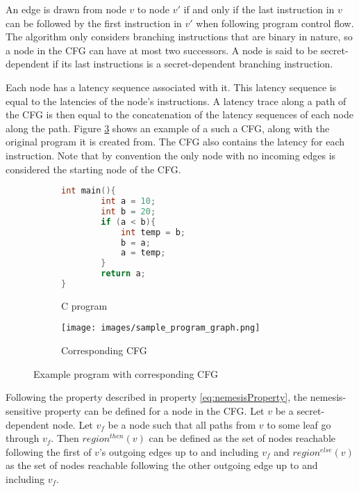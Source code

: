 An edge is drawn from node $v$ to node $v'$ if and only if the last instruction in $v$ can be followed by the first instruction in $v'$ 
when following program control flow. The algorithm only considers branching instructions that are binary in nature, so a node in the CFG can have at most two successors. 
A node is said to be secret-dependent if its last instructions is a 
secret-dependent branching instruction. 

Each node has a latency sequence associated with it. This latency sequence is equal to the latencies of the node's instructions.  
A latency trace along a path of the CFG is then equal to the concatenation of the latency sequences of each node along the path.
Figure \ref{fig:exampleCFG} shows an example of a such a CFG, along with the original program it is created from. The CFG also contains the latency for each instruction. Note that by convention the only node with no incoming edges is considered the starting node of the CFG. 

\begin{figure}
\centering
\begin{subfigure}{.4\textwidth}
  \centering
  
    \begin{lstlisting}[language=C]
int main(){
        int a = 10; 
        int b = 20; 
        if (a < b){
            int temp = b; 
            b = a; 
            a = temp; 
        } 
        return a;  
}\end{lstlisting}
  \caption{C program}
  \label{fig:c_program}
\end{subfigure}%
\begin{subfigure}{.7\textwidth}
  \centering
  \texttt{[image: images/sample\_program\_graph.png]}
  \caption{Corresponding CFG}
  \label{fig:c_program_cfg}
\end{subfigure}
\caption{Example program with corresponding CFG}
\label{fig:exampleCFG}
\end{figure}

Following the property described in property \ref{eq:nemesisProperty}, the nemesis-sensitive property can be defined for a node in the CFG. Let $v$ be a secret-dependent node. 
Let $v_f$ be a node such that all paths from $v$ to some leaf go through $v_f$. Then $region^{then}(v)$ can be defined as the set of nodes reachable following the 
first of $v$'s outgoing edges up to and including $v_f$ and $region^{else}(v)$ as the set of nodes reachable following the other outgoing edge up to and including $v_f$.

